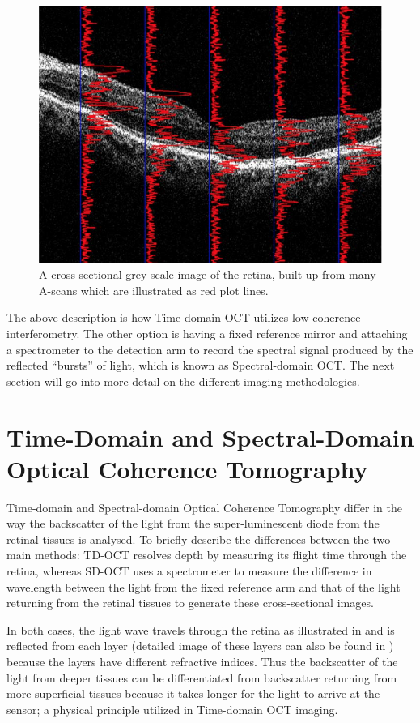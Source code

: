 \begin{figure}[htbp]
\centering
\includegraphics{figures/morgan_3}
\caption{A cross-sectional grey-scale image of the retina, built up from many A-scans which are illustrated as red plot lines. \cite{mbib_6} }
\label{fig:m_3}
\end{figure}


The above description is how Time-domain OCT utilizes low coherence interferometry.
The other option is having a fixed reference mirror and attaching a spectrometer to
the detection arm to record the spectral signal produced by the reflected
 “bursts” of light, which is known as Spectral-domain OCT.\cite{mbib_3} The next
section will go into more detail on the different imaging methodologies.

\section{Time-Domain and Spectral-Domain Optical Coherence Tomography}
Time-domain and Spectral-domain Optical Coherence Tomography differ in the way
the backscatter of the light from the super-luminescent diode from the retinal
tissues is analysed.  To briefly describe the differences between the two main
methods: TD-OCT resolves depth by measuring its flight time through the retina,
whereas SD-OCT uses a spectrometer to measure the difference in wavelength
between the light from the fixed reference arm and that of the light returning
from the retinal tissues to generate these cross-sectional images.\cite{mbib_7}

In both cases, the light wave travels through the retina as illustrated in  and
is reflected from each layer (detailed image of these layers can also be
found in  ) because the layers have different refractive indices.
Thus the backscatter of the light from deeper tissues can be differentiated from
backscatter returning from more superficial tissues because it takes longer for
the light to arrive at the sensor; a physical principle utilized in Time-domain OCT
imaging.\cite{mbib_4}


